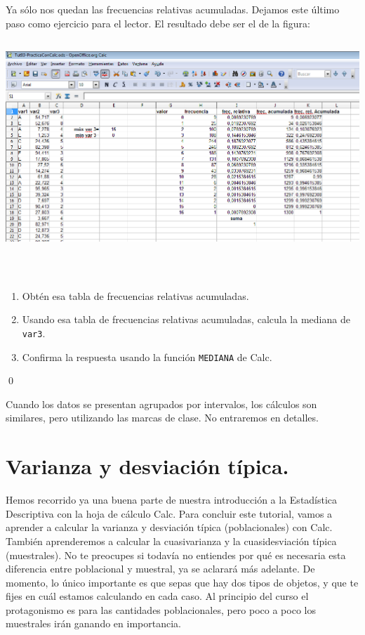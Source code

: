 \documentclass[10pt,a4paper]{article}\usepackage[]{graphicx}\usepackage[]{color}
\begin{document}
Ya sólo nos quedan las frecuencias relativas acumuladas. Dejamos este último paso como ejercicio para el lector. El resultado debe ser el de la figura:
    \begin{center}
    \includegraphics[height=8cm]{../fig/Tut03-07.png}
    \end{center}

\begin{ejercicio}
\quad\\
\begin{enumerate}
  \item Obtén esa tabla de frecuencias relativas acumuladas.
  \item Usando esa tabla de frecuencias relativas acumuladas, calcula la mediana de {\tt var3}.
  \item Confirma la respuesta usando la función {\tt MEDIANA} de Calc.
\end{enumerate}
\qed
\end{ejercicio}


Cuando los datos se presentan agrupados por intervalos, los cálculos son similares, pero utilizando las marcas de clase. No entraremos en detalles.

\section{Varianza y desviación típica.}
\label{tut01:sec:Varianza}

Hemos recorrido ya una buena parte de nuestra introducción a la Estadística Descriptiva con la hoja de cálculo Calc. Para concluir este tutorial, vamos a aprender a calcular la varianza y desviación típica (poblacionales) con Calc. También aprenderemos a calcular la cuasivarianza y la cuasidesviación típica  (muestrales). No te preocupes si todavía no entiendes por qué es necesaria esta diferencia entre poblacional y muestral, ya se aclarará más adelante. De momento, lo único importante es que sepas que hay dos tipos de objetos, y que te fijes en cuál estamos calculando en cada caso. Al principio del curso el protagonismo es para las cantidades poblacionales, pero poco a poco los muestrales irán ganando en importancia.\\
\end{document}
